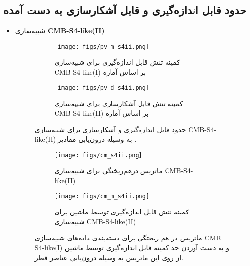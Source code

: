 \subsection{حدود قابل اندازه‌گیری و قابل آشکارسازی به دست آمده}
\label{subsec:upper_bounds}

\begin{itemize}
	\item 
	شبیه‌سازی\textbf{
		CMB-S4-like(II)}
	
	\begin{figure}[H]
		\centering
		\begin{subfigure}{0.5\textwidth}
			\centering
			\texttt{[image: figs/pv\_m\_s4ii.png]}
			\caption{   کمینه تنش قابل اندازه‌گیری برای شبیه‌سازی 
				\\	CMB-S4-like(I)
				بر اساس آماره }
		\end{subfigure}%
		\begin{subfigure}{0.5\textwidth}
			\centering
			\texttt{[image: figs/pv\_d\_s4ii.png]}
			\caption{  کمینه تنش قابل آشکارسازی برای شبیه‌سازی 
				\\ CMB-S4-like(II)
				بر اساس آماره  }
		\end{subfigure}
		
		\caption{حدود قابل اندازه‌گیری و آشکارسازی برای شبیه‌سازی 
			CMB-S4-like(II)
			به وسیله درون‌یابی مقادیر 
			.}
		\label{fig:s4i_cm}
	\end{figure}
	\begin{figure}[H]
		\centering
		\begin{subfigure}{\textwidth}
			\centering
			\texttt{[image: figs/cm\_s4ii.png]}
			\caption{  ماتریس درهم‌ریختگی برای شبیه‌سازی 
				CMB-S4-like(II) }
		\end{subfigure}%
		
		\begin{subfigure}{0.5\linewidth}
			\centering
			\texttt{[image: figs/cm\_m\_s4ii.png]}
			\caption{  کمینه تنش قابل اندازه‌گیری توسط ماشین برای شبیه‌سازی 
				CMB-S4-like(II) }
		\end{subfigure}
		
		\caption{ماتریس در هم ریختگی برای دسته‌بندی داده‌های شبیه‌سازی
			CMB-S4-like(I)
			و به دست آوردن حد کمینه قابل اندازه‌گیری توسط ماشین از روی این ماتریس به وسیله درون‌یابی عناصر قطر.}
		\label{fig:s4i_pv}
	\end{figure}
	

\end{itemize}
